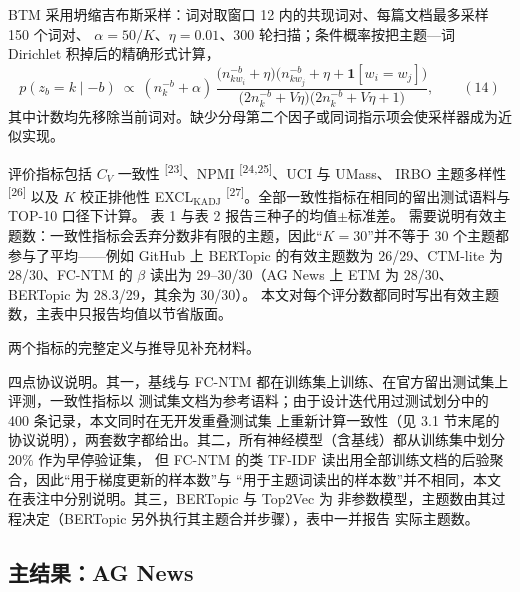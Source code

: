 \documentclass{article}
\begin{document}
BTM 采用坍缩吉布斯采样：词对取窗口 12 内的共现词对、每篇文档最多采样 150 个词对、
$\alpha=50/K$、$\eta=0.01$、300 轮扫描；条件概率按把主题—词 Dirichlet 积掉后的精确形式计算，
\begin{equation}
p(z_b=k\mid -b)\ \propto\
(n_k^{-b}+\alpha)\,
\frac{\big(n_{kw_i}^{-b}+\eta\big)\big(n_{kw_j}^{-b}+\eta+\mathbf 1[w_i=w_j]\big)}
{\big(2n_k^{-b}+V\eta\big)\big(2n_k^{-b}+V\eta+1\big)} ,
\label{eq:btmcond}
\qquad(14)\end{equation}
其中计数均先移除当前词对。缺少分母第二个因子或同词指示项会使采样器成为近似实现。

评价指标包括 $C_V$ 一致性 \textsuperscript{[23]}、NPMI \textsuperscript{[24,25]}、UCI 与 UMass、
IRBO 主题多样性 \textsuperscript{[26]} 以及 $K$ 校正排他性 EXCL$_{\mathrm{KADJ}}$
\textsuperscript{[27]}。全部一致性指标在相同的留出测试语料与 TOP-10 口径下计算。
表 1 与表 2 报告三种子的均值$\pm$标准差。
需要说明有效主题数：一致性指标会丢弃分数非有限的主题，因此“$K=30$”并不等于 30 个主题都
参与了平均——例如 GitHub 上 BERTopic 的有效主题数为 26/29、CTM-lite 为 28/30、FC-NTM 的
$\beta$ 读出为 29--30/30（AG News 上 ETM 为 28/30、BERTopic 为 28.3/29，其余为 30/30）。
本文对每个评分数都同时写出有效主题数，主表中只报告均值以节省版面。

两个指标的完整定义与推导见补充材料。

四点协议说明。其一，基线与 FC-NTM 都在训练集上训练、在官方留出测试集上评测，一致性指标以
测试集文档为参考语料；由于设计迭代用过测试划分中的 400 条记录，本文同时在无开发重叠测试集
上重新计算一致性（见 3.1 节末尾的协议说明），两套数字都给出。其二，所有神经模型（含基线）都从训练集中划分 20\% 作为早停验证集，
但 FC-NTM 的类 TF-IDF 读出用全部训练文档的后验聚合，因此“用于梯度更新的样本数”与
“用于主题词读出的样本数”并不相同，本文在表注中分别说明。其三，BERTopic 与 Top2Vec 为
非参数模型，主题数由其过程决定（BERTopic 另外执行其主题合并步骤），表中一并报告
实际主题数。

\subsection{主结果：AG News}
\label{sec:main-agnews}
\end{document}
